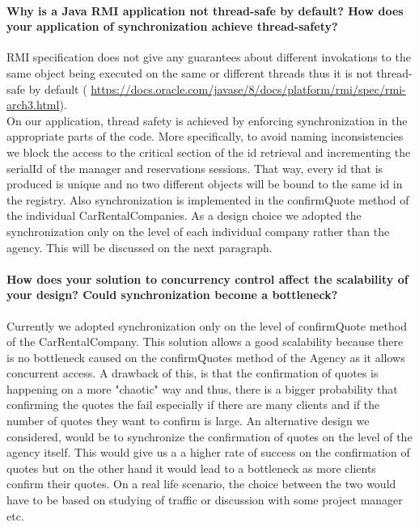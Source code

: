 \documentclass{ds-report}
\begin{document}
		
	\paragraph{Why is a Java RMI application not thread-safe by default? How does your application of synchronization achieve thread-safety?\\}
    RMI specification does not give any guarantees about different invokations to the same object being executed on the same or different threads
    thus it is not thread-safe by default ( \url{https://docs.oracle.com/javase/8/docs/platform/rmi/spec/rmi-arch3.html}). \\
    On our application, thread safety is achieved by enforcing synchronization in the appropriate parts of the code. More specifically, to avoid
    naming inconsistencies we block the access to the critical section of the id retrieval and incrementing the serialId of the manager and reservations sessions.
    That way, every id that is produced is unique and no two different objects will be bound to the same id in the registry.
    Also synchronization is implemented in the confirmQuote method of the individual CarRentalCompanies. As a design choice we adopted
    the synchronization only on the level of each individual company rather than the agency. This will be discussed on the next paragraph.

	\paragraph{How does your solution to concurrency control affect the scalability of your design? Could synchronization become a bottleneck?\\}
    Currently we adopted synchronization only on the level of confirmQuote method of the CarRentalCompany. This solution allows a
    good scalability because there is no bottleneck caused on the confirmQuotes method of the Agency as it allows concurrent access.
    A drawback of this, is that the confirmation of quotes is happening on a more "chaotic" way and thus, there is a bigger probability
    that confirming the quotes the fail especially if there are many clients and if the number of quotes they want to confirm is large.
    An alternative design we considered, would be to synchronize the confirmation of quotes on the level of the agency itself. This
    would give us a a higher rate of success on the confirmation of quotes but on the other hand it would lead to a bottleneck as
    more clients confirm their quotes.
    On a real life scenario, the choice between the two would have to be based on studying of traffic or discussion with some project
    manager etc.
    
\end{document}
